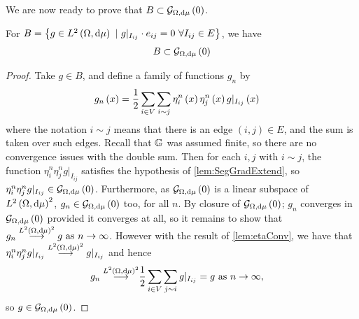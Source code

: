 We are now ready to prove that $B\subset\mathcal{G}_{ \Omega, \mathrm{d}\mu}\left( 0 \right)$.
\begin{prop} \label{prop:BIncGrad0}
	For $B=\clbracs{g\in\ltwo{\ddom}{\ddmes} \ \vert \ g\vert_{I_{ij}}\cdot e_{ij}=0 \ \forall I_{ij}\in E}$, we have
	\begin{align*}
		B \subset \mathcal{G}_{ \Omega, \mathrm{d}\mu}\left( 0 \right)
	\end{align*}
\end{prop}
\begin{proof}
	Take $g\in B$, and define a family of functions $g_{n}$ by
	\begin{align*}
		g_{n}\left( x \right) &= \frac{1}{2}\sum_{i\in V}\sum_{i\sim j}\eta_{i}^{n}\left( x \right)\eta_{j}^{n}\left( x \right)g\vert_{I_{ij}}\left( x \right)
	\end{align*}
	where the notation $i\sim j$ means that there is an edge $(i,j)\in E$, and the sum is taken over such edges.
	Recall that $\mathbb{G}$ was assumed finite, so there are no convergence issues with the double sum.
	Then for each $i,j$ with $i\sim j$, the function $\eta_{i}^{n}\eta_{j}^{n}g\vert_{I_{ij}}$ satisfies the hypothesis of \ref{lem:SegGradExtend}, so $\eta_{i}^{n}\eta_{j}^{n}g\vert_{I_{ij}}\in\mathcal{G}_{ \Omega, \mathrm{d}\mu}\left( 0 \right)$.
	Furthermore, as $\mathcal{G}_{ \Omega, \mathrm{d}\mu}\left( 0 \right)$ is a linear subspace of $L^{2}\left( \Omega,\mathrm{d}\mu \right)^{2}$, $g_{n}\in\mathcal{G}_{ \Omega, \mathrm{d}\mu}\left( 0 \right)$ too, for all $n$.
	By closure of $\mathcal{G}_{ \Omega, \mathrm{d}\mu}\left( 0 \right)$; $g_{n}$ converges in $\mathcal{G}_{ \Omega, \mathrm{d}\mu}\left( 0 \right)$ provided it converges at all, so it remains to show that $g_{n}\overset{L^{2}\left( \Omega,\mathrm{d}\mu \right)^2}{\longrightarrow} g \ \text{as} \ n \rightarrow\infty$.
	However with the result of \ref{lem:etaConv}, we have that $\eta_{i}^{n}\eta_{j}^{n}g\vert_{I_{ij}}\overset{L^{2}\left( \Omega,\mathrm{d}\mu \right)^2}{\longrightarrow} g\vert_{I_{ij}}$ and hence
	\begin{align*}
		g_{n} \overset{L^{2}\left( \Omega,\mathrm{d}\mu \right)^2}{\longrightarrow} &\frac{1}{2}\sum_{i\in V}\sum_{j\sim i}g\vert_{I_{ij}} = g \ \text{as} \ n \rightarrow\infty,
	\end{align*}
	so $g\in\mathcal{G}_{ \Omega, \mathrm{d}\mu}\left( 0 \right)$.
\end{proof}

